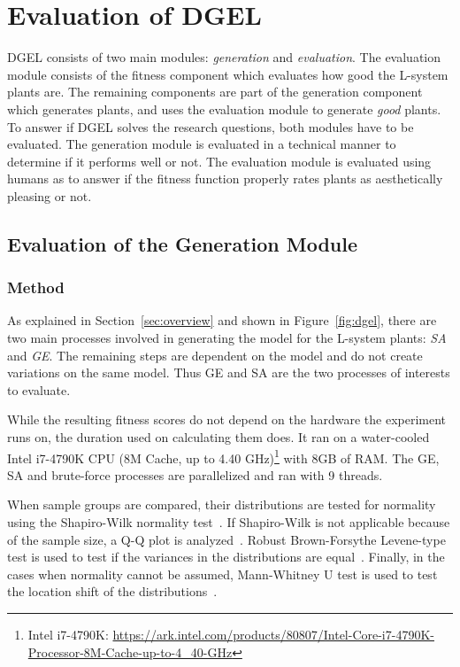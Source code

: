 \chapter[Evaluation of DGEL]{Evaluation of \gls{DGEL}}
\gls{DGEL} consists of two main modules: \textit{generation} and \textit{evaluation}.
The evaluation module consists of the fitness component which evaluates how good the \gls{L-system} plants are.
The remaining components are part of the generation component which generates plants, and uses the evaluation module to generate \textit{good} plants.
To answer if \gls{DGEL} solves the research questions, both modules have to be evaluated.
The generation module is evaluated in a technical manner to determine if it performs well or not.
The evaluation module is evaluated using humans as to answer if the fitness function properly rates plants as aesthetically pleasing or not.

\section{Evaluation of the Generation Module}
\subsection{Method}
As explained in Section~\ref{sec:overview} and shown in Figure~\ref{fig:dgel}, there are two main processes involved in generating the model for the \gls{L-system} plants: \textit{\gls{SA}} and \textit{\gls{GE}}.
The remaining steps are dependent on the model and do not create variations on the same model.
Thus \gls{GE} and \gls{SA} are the two processes of interests to evaluate.

While the resulting fitness scores do not depend on the hardware the experiment runs on, the duration used on calculating them does.
It ran on a water-cooled Intel i7-4790K CPU (8M Cache, up to 4.40 GHz)\footnote{Intel i7-4790K: \url{https://ark.intel.com/products/80807/Intel-Core-i7-4790K-Processor-8M-Cache-up-to-4_40-GHz}} with 8GB of RAM.
The \gls{GE}, \gls{SA} and brute-force processes are parallelized and ran with 9 threads.

When sample groups are compared, their distributions are tested for normality using the Shapiro-Wilk normality test~\cite{1965Shapiro}.
If Shapiro-Wilk is not applicable because of the sample size, a Q-Q plot is analyzed~\cite{1968Wilk}.
Robust Brown-Forsythe Levene-type test is used to test if the variances in the distributions are equal~\cite{1974Brown}.
Finally, in the cases when normality cannot be assumed, Mann-Whitney U test is used to test the location shift of the distributions~\cite{1947Mann}.

